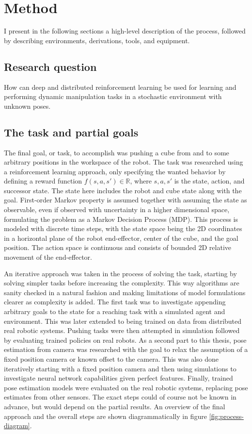 \chapter{Method}

I present in the following sections a high-level description of the process,
followed by describing environments, derivations, tools, and equipment.

\section{Research question}

How can deep and distributed reinforcement learning be used for learning and
performing dynamic manipulation tasks in a stochastic environment with unknown
poses.

\section{The task and partial goals}

The final goal, or task, to accomplish was pushing a cube from and to some
arbitrary positions in the workspace of the robot. The task was researched
using a reinforcement learning approach, only specifying the wanted behavior by
defining a reward function $f(s, a, s') \in \mathbb{R}$, where $s, a, s'$ is
the state, action, and successor state. The state here includes the robot and
cube state along with the goal. First-order Markov property is assumed together
with assuming the state as observable, even if observed with uncertainty in a
higher dimensional space, formulating the problem as a Markov Decision Process
(MDP). This process is modeled with discrete time steps, with the state space
being the 2D coordinates in a horizontal plane of the robot end-effector,
center of the cube, and the goal position. The action space is continuous and
consists of bounded 2D relative movement of the end-effector.

An iterative approach was taken in the process of solving the task, starting by
solving simpler tasks before increasing the complexity. This way algorithms are
sanity checked in a natural fashion and making limitations of model
formulations clearer as complexity is added. The first task was to investigate
appending arbitrary goals to the state for a reaching task with a simulated
agent and environment. This was later extended to being trained on data from
distributed real robotic systems. Pushing tasks were then attempted in
simulation followed by evaluating trained policies on real robots. As a second
part to this thesis, pose estimation from camera was researched with the goal
to relax the assumption of a fixed position camera or known offset to the
camera. This was also done iteratively starting with a fixed position camera
and then using simulations to investigate neural network capabilities given
perfect features. Finally, trained pose estimation models were evaluated on the
real robotic systems, replacing pose estimates from other sensors. The exact
steps could of course not be known in advance, but would depend on the partial
results. An overview of the final approach and the overall steps are shown
diagrammatically in figure \ref{fig:process-diagram}.

